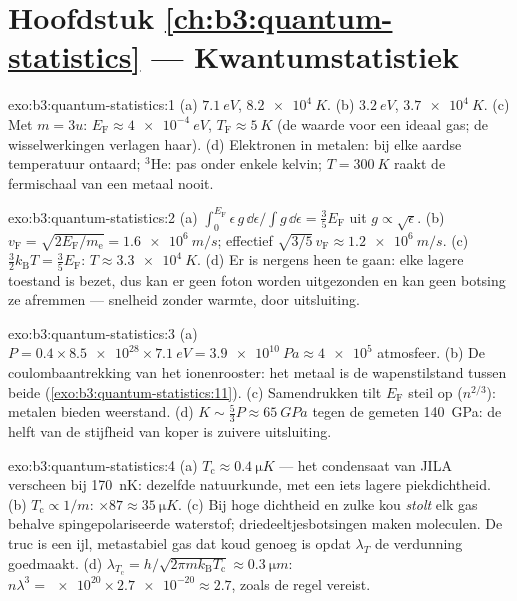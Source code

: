 \section*{Hoofdstuk \ref{ch:b3:quantum-statistics} --- Kwantumstatistiek}

\begin{solution}{exo:b3:quantum-statistics:1}
(a) $\qty{7.1}{eV}$, $\qty{8.2e4}{K}$. (b) $\qty{3.2}{eV}$,
$\qty{3.7e4}{K}$. (c) Met $m = 3u$: $E_{\text{F}} \approx
\qty{4e-4}{eV}$, $T_{\text{F}} \approx \qty{5}{K}$ (de waarde voor een
ideaal gas; de wisselwerkingen verlagen haar). (d) Elektronen in metalen:
bij elke aardse temperatuur ontaard; $^3$He: pas onder enkele kelvin; $T = \qty{300}{K}$ raakt de fermischaal van een metaal nooit.
\end{solution}

\begin{solution}{exo:b3:quantum-statistics:2}
(a) $\int_0^{E_{\text{F}}}\epsilon\,g\,\dd\epsilon/\int g\,\dd
\epsilon = \tfrac35 E_{\text{F}}$ uit $g \propto \sqrt\epsilon$.
(b) $v_{\text{F}} = \sqrt{2E_{\text{F}}/m_{\text{e}}} =
\qty{1.6e6}{m/s}$; effectief $\sqrt{3/5}\,v_{\text{F}} \approx
\qty{1.2e6}{m/s}$. (c) $\tfrac32 k_{\text{B}}T = \tfrac35
E_{\text{F}}$:
$T \approx \qty{3.3e4}{K}$. (d) Er is nergens heen te gaan: elke lagere
toestand is bezet, dus kan er geen foton worden uitgezonden en kan geen
botsing ze afremmen --- snelheid zonder warmte, door uitsluiting.
\end{solution}

\begin{solution}{exo:b3:quantum-statistics:3}
(a) $P = 0.4 \times \num{8.5e28} \times \qty{7.1}{eV} =
\qty{3.9e10}{Pa} \approx \num{4e5}$ atmosfeer. (b) De coulombaantrekking
van het ionenrooster: het metaal is de wapenstilstand tussen beide
(\cref{exo:b3:quantum-statistics:11}). (c) Samendrukken tilt
$E_{\text{F}}$ steil op ($n^{2/3}$): metalen bieden weerstand. (d) $K \sim
\tfrac53 P \approx \qty{65}{GPa}$ tegen de gemeten \qty{140}{GPa}: de
helft van de stijfheid van koper is zuivere uitsluiting.
\end{solution}

\begin{solution}{exo:b3:quantum-statistics:4}
(a) $T_{\text{c}} \approx \qty{0.4}{\micro K}$ --- het condensaat van JILA
verscheen bij \qty{170}{nK}: dezelfde natuurkunde, met een iets lagere
piekdichtheid. (b) $T_{\text{c}} \propto 1/m$: $\times87 \approx
\qty{35}{\micro K}$. (c) Bij hoge dichtheid en zulke kou \emph{stolt} elk
gas behalve spingepolariseerde waterstof; driedeeltjesbotsingen maken
moleculen. De truc is een ijl, metastabiel gas dat koud genoeg is opdat
$\lambda_T$ de verdunning goedmaakt. (d)
$\lambda_{T_{\text{c}}} = h/\sqrt{2\pi mk_{\text{B}}T_{\text{c}}}
\approx \qty{0.3}{\micro m}$: $n\lambda^3 = \num{e20} \times
\num{2.7e-20} \approx 2.7$, zoals de regel vereist.
\end{solution}

